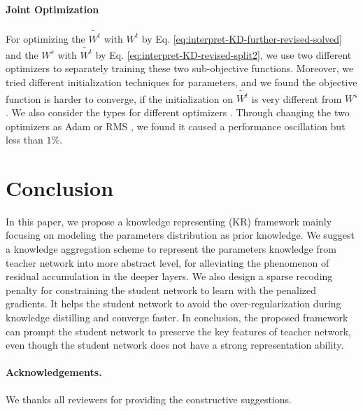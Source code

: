 \documentclass[10pt,twocolumn,letterpaper]{article}
\begin{document}
\paragraph{Joint Optimization}
For optimizing the $\tilde{W^t}$ with $W^t$ by Eq. \ref{eq:interpret-KD-further-revised-solved}
and the $W^s$ with $\tilde{W^t}$ by Eq. \ref{eq:interpret-KD-revised-split2},
we use two different optimizers to separately training these two sub-objective functions.
Moreover,
we tried different initialization techniques for parameters,
and we found the objective function is harder to converge,
if the initialization on $\tilde{W^t}$ is very different from $W^s$.
We also consider the types for different optimizers \cite{adam2014, Bottou2012, rmsprop2012}.
Through changing the two optimizers as Adam \cite{adam2014} or RMS \cite{rmsprop2012},
we found it caused a performance oscillation but less than $1\%$.

\section{Conclusion}
In this paper,
we propose a knowledge representing (KR) framework
mainly focusing on modeling the parameters distribution as prior knowledge.
We suggest a knowledge aggregation scheme to
represent the parameters knowledge from teacher network into more abstract level,
for alleviating the phenomenon of residual accumulation in the deeper layers.
We also design a sparse recoding penalty for constraining
the student network to learn with the penalized gradients.
It helps the student network to avoid
the over-regularization during knowledge distilling and converge faster.
In conclusion,
the proposed framework can prompt the student network
to preserve the key features of teacher network,
even though the student network does not have a strong representation ability.

\paragraph{Acknowledgements.} We thanks all reviewers for providing the constructive suggestions.

{\small


}
\end{document}
